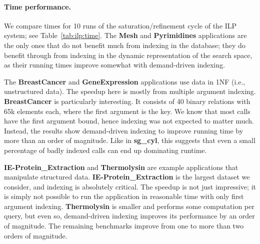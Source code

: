 \documentclass{llncs}
\newcommand{\JITI}{demand-driven indexing\xspace}
\newcommand{\bench}[1]{\textbf{\textsf{#1}}}
\newcommand{\sgCyl}{\bench{sg\_cyl}\xspace}
\newcommand{\BreastCancer}{\bench{BreastCancer}\xspace}
\newcommand{\GeneExpr}{\bench{GeneExpression}\xspace}
\newcommand{\IEProtein}{\bench{IE-Protein\_Extraction}\xspace}
\newcommand{\Mesh}{\bench{Mesh}\xspace}
\newcommand{\Pyrimidines}{\bench{Pyrimidines}\xspace}
\newcommand{\Thermolysin}{\bench{Thermolysin}\xspace}
\begin{document}
\paragraph*{Time performance.}
We compare times for 10 runs of the saturation/refinement cycle of the
ILP system; see Table~\ref{tab:ilp:time}.
The \Mesh and \Pyrimidines applications are the only ones that do not
benefit much from indexing in the database; they do benefit through
from indexing in the dynamic representation of the search space, as
their running times improve somewhat with \JITI.

The \BreastCancer and \GeneExpr applications use data in 1NF (i.e.,
unstructured data). The speedup here is mostly from multiple argument
indexing. \BreastCancer is particularly interesting. It consists of 40
binary relations with 65k elements each, where the first argument is
the key. We know that most calls have the first argument bound, hence
indexing was not expected to matter much. Instead, the results show
\JITI to improve running time by more than an order of magnitude. Like in
\sgCyl, this suggests that even a small percentage of badly indexed
calls can end up dominating runtime.

\IEProtein and \Thermolysin are example applications that manipulate
structured data. \IEProtein is the largest dataset we consider, and
indexing is absolutely critical. The speedup is not just impressive;
it is simply not possible to run the application in reasonable time
with only first argument indexing. \Thermolysin is smaller and
performs some computation per query, but even so, \JITI improves its
performance by an order of magnitude. The remaining benchmarks improve
from one to more than two orders of magnitude.
\end{document}
